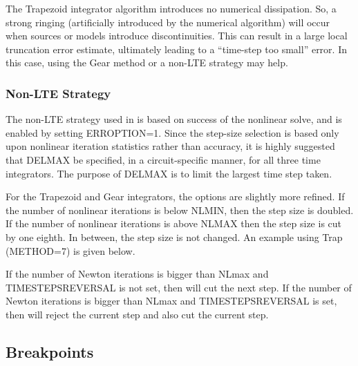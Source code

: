 The Trapezoid integrator algorithm introduces no numerical dissipation.  So,
a strong ringing (artificially introduced by the numerical algorithm) will
occur when sources or models introduce discontinuities.  This can result in a
large local truncation error estimate, ultimately leading to a ``time-step too
small'' error.  In this case, using the Gear method or a non-LTE
strategy may help.

\subsubsection{Non-LTE Strategy}
The non-LTE strategy used in \Xyce{} is based on success of the nonlinear solve, and is enabled by setting ERROPTION=1.  Since the step-size selection is based only upon nonlinear iteration statistics rather than accuracy, it is highly suggested that DELMAX be specified, in a circuit-specific manner, for all three time integrators.  The purpose of DELMAX is to limit the largest time step taken.


For the Trapezoid and Gear integrators, the options are slightly more refined.  If the number of nonlinear iterations is below NLMIN, then the step size is doubled. If the number of nonlinear iterations is above NLMAX then the step size is cut by one eighth.  In between, the step size is not changed.  An example using Trap (METHOD=7) is given below. 
  


If the number of Newton iterations is bigger than NLmax and TIMESTEPSREVERSAL is not set, then \Xyce{} will cut the next step.  If the number of Newton iterations is bigger than NLmax and  TIMESTEPSREVERSAL is set, then \Xyce{} will reject the current step and also cut the current step.


\subsection{Breakpoints}

